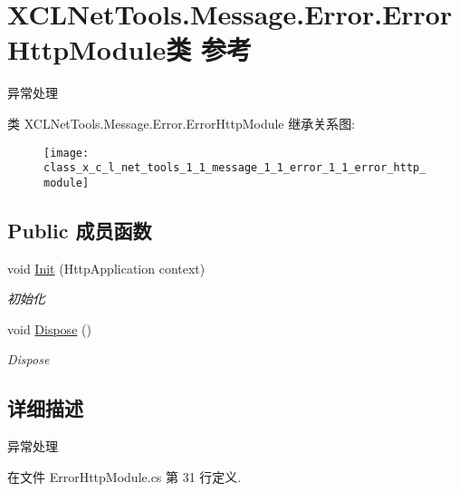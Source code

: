 \hypertarget{class_x_c_l_net_tools_1_1_message_1_1_error_1_1_error_http_module}{\section{X\-C\-L\-Net\-Tools.\-Message.\-Error.\-Error\-Http\-Module类 参考}
\label{class_x_c_l_net_tools_1_1_message_1_1_error_1_1_error_http_module}
}


异常处理  


类 X\-C\-L\-Net\-Tools.\-Message.\-Error.\-Error\-Http\-Module 继承关系图\-:\begin{figure}[H]
\begin{center}
\leavevmode
\texttt{[image: class\_x\_c\_l\_net\_tools\_1\_1\_message\_1\_1\_error\_1\_1\_error\_http\_module]}
\end{center}
\end{figure}
\subsection*{Public 成员函数}
\begin{DoxyCompactItemize}
\item 
void \hyperlink{class_x_c_l_net_tools_1_1_message_1_1_error_1_1_error_http_module_aa4e06d53382795826ed453b62afa265d}{Init} (Http\-Application context)
\begin{DoxyCompactList}\small\item\em 初始化 \end{DoxyCompactList}\item 
void \hyperlink{class_x_c_l_net_tools_1_1_message_1_1_error_1_1_error_http_module_a796d6d747b8620b5e260858e05abd09f}{Dispose} ()
\begin{DoxyCompactList}\small\item\em Dispose \end{DoxyCompactList}\end{DoxyCompactItemize}


\subsection{详细描述}
异常处理 



在文件 Error\-Http\-Module.\-cs 第 31 行定义.



